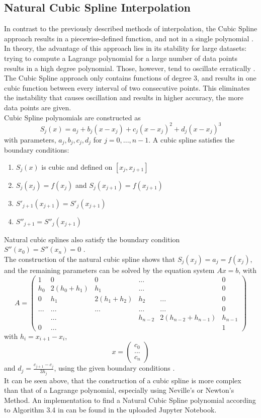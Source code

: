 \documentclass[a4paper,11pt, notitlepage]{article}
\newcommand{\enq}[1]{\grqq{}#1\grqq{}}
\begin{document}
\begin{onehalfspace}
\subsection{Natural Cubic Spline Interpolation}
\label{subsec:cs}
In contrast to the previously described methods of interpolation, the Cubic Spline approach results in a piecewise-defined function, and not in a single polynomial \cite{burden1985numerical}. In theory, the advantage of this approach lies in its stability for large datasets: trying to compute a Lagrange polynomial for a large number of data points results in a high degree polynomial. Those, however, tend to \enq{oscillate erratically} \cite{burden1985numerical}. The Cubic Spline approach only contains functions of degree 3, and results in one cubic function between every interval of two consecutive points. This eliminates the instability that causes oscillation and results in higher accuracy, the more data points are given.\\
Cubic Spline polynomials are constructed as 
$$S_j(x)=a_j + b_j(x-x_j)+c_j(x-x_j)^2 +d_j(x-x_j)^3$$
with parameters, $a_j, b_j, c_j, d_j$ for $j=0,...,n-1$. A cubic spline satisfies the boundary conditions:
\begin{enumerate}
	\item $S_j(x)$ is cubic and defined on $[x_j, x_{j+1}]$
	\item $S_j(x_j)=f(x_j)$ and $S_j(x_{j+1})=f(x_{j+1})$
	\item $S'_{j+1}(x_{j+1})=S'_j(x_{j+1})$
	\item $S''_{j+1}=S''_j(x_{j+1})$
\end{enumerate}

Natural cubic splines also satisfy the boundary condition $S''(x_0)=S''(x_n)=0$ \cite{burden1985numerical}.\\
The construction of the natural cubic spline shows that $S_j(x_j)=a_j=f(x_j)$, and the remaining parameters can be solved by the equation system $Ax=b$, with
$$A=\begin{pmatrix}
	1 & 0 & 0 & ...& & 0 \\
	h_0 & 2(h_0 + h_1) & h_1 & ... & & 0 \\
	0 & h_1 & 2(h_1 + h_2) & h_2 & ... & 0\\
	... & ... & ... & ... & ... & 0\\
	& ... &  & h_{n-2} & 2(h_{n-2} + h_{n-1}) & h_{n-1} \\
	0 & ... & & & & 1   
\end{pmatrix}$$
with $h_i = x_{i+1} - x_i$,
$$x=\begin{pmatrix}
	c_0 \\
	...\\
	c_n
\end{pmatrix}$$
and $d_j = \frac{c_{j+1} - c_j}{3h_j}$, using the given boundary conditions \cite{burden1985numerical}. \\
It can be seen above, that the construction of a cubic spline is more complex than that of a Lagrange polynomial, especially using Neville's or Newton's Method. An implementation to find a Natural Cubic Spline polynomial according to Algorithm 3.4 in \cite{burden1985numerical} can be found in the uploaded Jupyter Notebook.



\end{onehalfspace}
\end{document}
